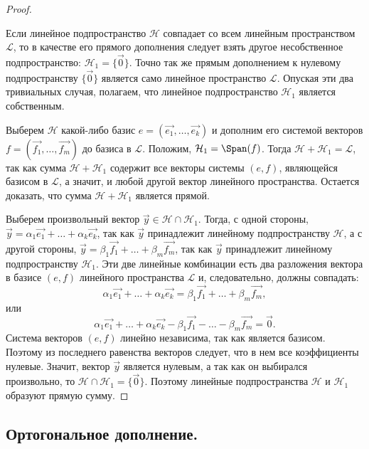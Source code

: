 \begin{proof}~

    Если линейное подпространство $\mathcal{H}$  совпадает со всем линейным пространством $\mathcal{L}$, то в качестве его прямого дополнения следует взять другое несобственное подпространство: $\mathcal{H}_1 = \{\vec{0}\}$. Точно так же прямым дополнением к нулевому подпространству $\{\vec{0}\}$ является само линейное пространство $\mathcal{L}$. Опуская эти два тривиальных случая, полагаем, что линейное подпространство $\mathcal{H}_1$ является собственным.

    Выберем $\mathcal{H}$ какой-либо базис $e = (\vec{e_1}, \ldots, \vec{e_k})$ и дополним его системой векторов $f = (\vec{f_1}, \ldots, \vec{f_m})$ до базиса в $\mathcal{L}$. Положим, $\mathcal{H}_1 = \Span(f)$. Тогда $\mathcal{H} + \mathcal{H}_1 = \mathcal{L}$, так как сумма $\mathcal{H} + \mathcal{H}_1$ содержит все векторы системы $(e, f)$, являющейся базисом в $\mathcal{L}$, а значит, и любой другой вектор линейного пространства. Остается доказать, что сумма $\mathcal{H} + \mathcal{H}_1$ является прямой.

    Выберем произвольный вектор $\vec{y} \in \mathcal{H} \cap \mathcal{H}_1$. Тогда, с одной стороны, $\vec{y} = \alpha_1\vec{e_1} + \ldots + \alpha_k\vec{e_k}$, так как $\vec{y}$ принадлежит линейному подпространству $\mathcal{H}$, а с другой стороны, $\vec{y} = \beta_1\vec{f_1} + \ldots + \beta_m\vec{f_m}$, так как $\vec{y}$ принадлежит линейному подпространству $\mathcal{H}_1$. Эти две линейные комбинации есть два разложения вектора в базисе $(e, f)$ линейного пространства $\mathcal{L}$ и, следовательно, должны совпадать:
    $$\alpha_1\vec{e_1} + \ldots + \alpha_k\vec{e_k} = \beta_1\vec{f_1} + \ldots + \beta_m\vec{f_m},$$
    или
    $$\alpha_1\vec{e_1} + \ldots + \alpha_k\vec{e_k} - \beta_1\vec{f_1} - \ldots - \beta_m\vec{f_m} = \vec{0}.$$
    Система векторов $(e, f)$ линейно независима, так как является базисом. Поэтому из последнего равенства векторов следует, что в нем все коэффициенты нулевые. Значит, вектор $\vec{y}$ является нулевым, а так как он выбирался произвольно, то $\mathcal{H} \cap \mathcal{H}_1 = \{\vec{0}\}$. Поэтому линейные подпространства $\mathcal{H}$ и $\mathcal{H}_1$ образуют прямую сумму.
\end{proof}


\newpage


\subsection{
    Ортогональное дополнение.
}

